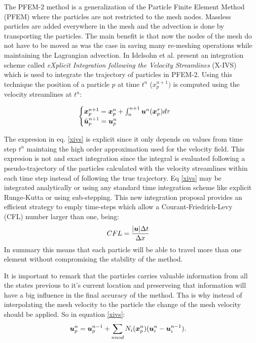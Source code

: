 The PFEM-2 method is a generalization of the Particle Finite Element Method (PFEM) \cite{sergio:pfem} where the particles are not restricted to the mesh nodes. Massless particles are added everywhere in the mesh and the advection is done by transporting the particles. The main benefit is that now the nodes of the mesh do not have to be moved as was the case in \cite{sergio:pfem} saving many re-meshing operations while maintaining the Lagrangian advection. In \cite{sergio:xivs1} Idelsohn et al. present an integration scheme called {\em eXplicit Integration following the Velocity Streamlines} (X-IVS) which is used to integrate the trajectory of particles in PFEM-2. Using this technique the position of a particle $p$ at time $t^n$ ($x_p^{n+1})$ is computed using the velocity streamlines at $t^n$:

\begin{equation}\label{xivs}
  \begin{cases}
    \boldsymbol{x}_p^{n+1}=\boldsymbol{x}_p^n+\int_n^{n+1} \boldsymbol{u}^n(\boldsymbol{x}_p^\tau) d\tau\\
    \hat{\boldsymbol{u}}^{n+1}_p=\boldsymbol{u}_p^n
  \end{cases}
\end{equation}

The expresion in eq. \ref{xivs} is explicit since it only depends on values from time step $t^n$ maintaing the high order approximation used for the velocity field. This expresion is not and exact integration since the integral is evaluated following a pseudo-trajectory of the particles calculated with the velocity streamlines within each time step instead of following the true trajectory. Eq \ref{xivs} may be integrated analytically or using any standard time integration scheme like explicit Runge-Kutta or using sub-stepping. This new integration proposal provides an efficient strategy to emply time-steps which allow a Courant-Friedrich-Levy (CFL) number larger than one, being:
\begin{equation}
  CFL=\frac{|\boldsymbol{u}|\Delta t}{\Delta x}
\end{equation}
In summary  this means that each particle will be able to travel more than one element without compromising the stability of the method.

It is important to remark that the particles carries valuable information from all the states previous to it's current location and preserveing that information will have a big influence in the final accuracy of the method. Tha is why instead of interpolating the mesh velocity to the particle the change of the mesh velocity should be applied. So in equation \ref{xivs}:
\begin{equation}\label{eq:partcor}
  \boldsymbol{u}_p^{n}=\boldsymbol{u}_p^{n-1}+\sum_{nnod}N_i(\boldsymbol{x}_p^n)(\boldsymbol{u}_i^n-\boldsymbol{u}_i^{n-1}).
\end{equation}


